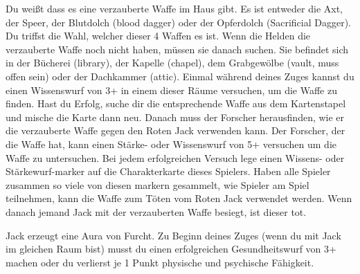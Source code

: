 \begin{itemize}
    \bitem Du weißt dass es eine verzauberte Waffe im Haus gibt. Es ist entweder die Axt, der Speer, der Blutdolch (blood dagger) oder der Opferdolch (Sacrificial Dagger).
   Du triffst die Wahl, welcher dieser 4 Waffen es ist.
    \bitem Wenn die Helden die verzauberte Waffe noch nicht haben, müssen sie danach suchen. Sie befindet sich in der Bücherei (library), der Kapelle (chapel), dem Grabgewölbe (vault, muss offen sein) oder der Dachkammer (attic). Einmal während deines Zuges kannst du einen Wissenswurf von 3+ in einem dieser Räume versuchen, um die Waffe zu finden. Hast du Erfolg, suche dir die entsprechende Waffe aus dem Kartenstapel und mische die Karte dann neu.
    \bitem Danach muss der Forscher herausfinden, wie er die verzauberte Waffe gegen den Roten Jack verwenden kann. Der Forscher, der die Waffe hat, kann einen Stärke- oder Wissenswurf von 5+ versuchen um die Waffe zu untersuchen. Bei jedem erfolgreichen Versuch lege einen Wissens- oder Stärkewurf-marker auf die Charakterkarte dieses Spielers. Haben alle Spieler zusammen so viele von diesen markern gesammelt, wie Spieler am Spiel teilnehmen, kann die Waffe zum Töten vom Roten Jack verwendet werden.
    \bitem Wenn danach jemand Jack mit der verzauberten Waffe besiegt, ist dieser tot.

\end{itemize}

Jack erzeugt eine Aura von Furcht. Zu Beginn deines Zuges (wenn du mit Jack im gleichen Raum bist) musst du einen erfolgreichen Gesundheitswurf von 3+ machen oder du verlierst je 1 Punkt physische und psychische Fähigkeit.


